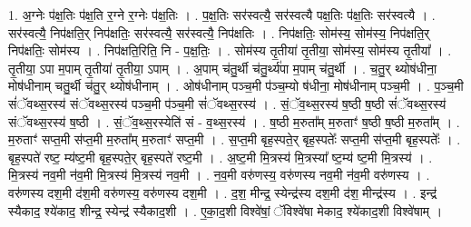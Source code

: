 \documentclass[17pt]{extarticle}
\begin{document}
1. अ॒ग्नेः प॑क्ष॒तिः प॑क्ष॒ति र॒ग्ने र॒ग्नेः प॑क्ष॒तिः । . प॒क्ष॒तिः सर॑स्वत्यै॒ सर॑स्वत्यै पक्ष॒तिः प॑क्ष॒तिः सर॑स्वत्यै । . सर॑स्वत्यै॒ निप॑क्षति॒र् निप॑क्षतिः॒ सर॑स्वत्यै॒ सर॑स्वत्यै॒ निप॑क्षतिः । . निप॑क्षतिः॒ सोम॑स्य॒ सोम॑स्य॒ निप॑क्षति॒र् निप॑क्षतिः॒ सोम॑स्य । . निप॑क्षति॒रिति॒ नि - प॒क्ष॒तिः॒ । . सोम॑स्य तृ॒तीया॑ तृ॒तीया॒ सोम॑स्य॒ सोम॑स्य तृ॒तीया᳚ । . तृ॒तीया॒ ऽपा म॒पाम् तृ॒तीया॑ तृ॒तीया॒ ऽपाम् । . अ॒पाम् च॑तु॒र्थी च॑तु॒र्थ्य॑पा म॒पाम् च॑तु॒र्थी । . च॒तु॒र् थ्योष॑धीना॒ मोष॑धीनाम् चतु॒र्थी च॑तु॒र् थ्योष॑धीनाम् । . ओष॑धीनाम् पञ्च॒मी प॑ञ्च॒म्यो ष॑धीना॒ मोष॑धीनाम् पञ्च॒मी । . प॒ञ्च॒मी सं॑ॅवथ्स॒रस्य॑ संॅवथ्स॒रस्य॑ पञ्च॒मी प॑ञ्च॒मी सं॑ॅवथ्स॒रस्य॑ । . सं॒ॅव॒थ्स॒रस्य॑ ष॒ष्ठी ष॒ष्ठी सं॑ॅवथ्स॒रस्य॑ संॅवथ्स॒रस्य॑ ष॒ष्ठी । . सं॒ॅव॒थ्स॒रस्येति॑ सं - व॒थ्स॒रस्य॑ । . ष॒ष्ठी म॒रुता᳚म् म॒रुताꣳ॑ ष॒ष्ठी ष॒ष्ठी म॒रुता᳚म् । . म॒रुताꣳ॑ सप्त॒मी स॑प्त॒मी म॒रुता᳚म् म॒रुताꣳ॑ सप्त॒मी । . स॒प्त॒मी बृह॒स्पते॒र् बृह॒स्पतेः᳚ सप्त॒मी स॑प्त॒मी बृह॒स्पतेः᳚ । . बृह॒स्पते॑ रष्ट॒ म्य॑ष्ट॒मी बृह॒स्पते॒र् बृह॒स्पते॑ रष्ट॒मी । . अ॒ष्ट॒मी मि॒त्रस्य॑ मि॒त्रस्या᳚ ष्ट॒म्य॑ ष्ट॒मी मि॒त्रस्य॑ । . मि॒त्रस्य॑ नव॒मी न॑व॒मी मि॒त्रस्य॑ मि॒त्रस्य॑ नव॒मी । . न॒व॒मी वरु॑णस्य॒ वरु॑णस्य नव॒मी न॑व॒मी वरु॑णस्य । . वरु॑णस्य दश॒मी द॑श॒मी वरु॑णस्य॒ वरु॑णस्य दश॒मी । . द॒श॒ मीन्द्र॒ स्येन्द्र॑स्य दश॒मी द॑श॒ मीन्द्र॑स्य । . इन्द्र॑ स्यैकाद॒ श्ये॑काद॒ शीन्द्र॒ स्येन्द्र॑ स्यैकाद॒शी । . ए॒का॒द॒शी विश्वे॑षां॒ ॅविश्वे॑षा मेकाद॒ श्ये॑काद॒शी विश्वे॑षाम् । \newline
\end{document}
